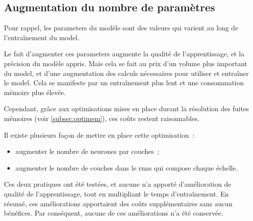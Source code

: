 \subsection{Augmentation du nombre de paramètres}\label{subsec:optiparam}
Pour rappel, les \glspl{parameter} du modèle sont des valeurs qui varient au long de l'entraînement du \gls{model}.

Le fait d'augmenter ces \glspl{parameter} augmente la qualité de l'apprentissage, et la précision du modèle appris. Mais cela se fait au prix d'un volume plus important du \gls{model}, et d'une augmentation des calculs nécessaires pour utiliser et entraîner le \gls{model}. Cela se manifeste par un entraînement plus lent et une consommation mémoire plus élevée.

Cependant, grâce aux optimisations mises en place durant la résolution des fuites mémoires (voir \autoref{subsec:optimem}), ces coûts restent raisonnables.

Il existe plusieurs façon de mettre en place cette optimisation~:
\begin{itemize}
	\item augmenter le nombre de neurones par couches~;
	\item augmenter le nombre de couches dans le \glspl{rnn} qui compose chaque \og échelle\fg{}.
\end{itemize}

Ces deux pratiques ont été testées, et aucune n'a apporté d'amélioration de qualité de l'apprentissage, tout en multipliant le temps d'entraînement.
En résumé, ces améliorations apportaient des coûts supplémentaires sans aucun bénéfices. Par conséquent, aucune de ces améliorations n'a été conservée.